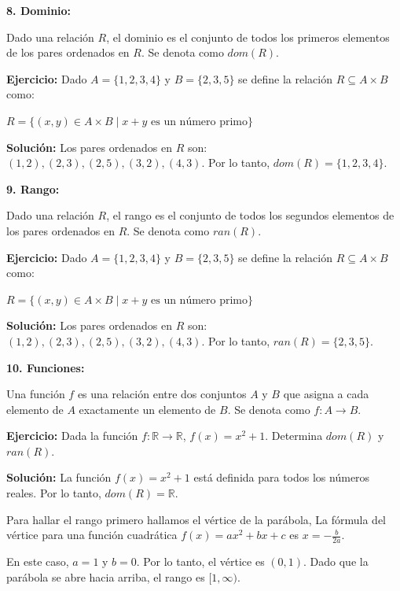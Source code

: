 \documentclass[11pt, a4paper]{article}
\begin{document}
\begin{multicols}{2}
    \begin{center}
      \textbf{8. Dominio:}
    \end{center}
    Dado una relación $R$, el dominio es el conjunto de todos los primeros elementos de los pares ordenados en $R$. Se denota como $dom(R)$.
    
    \textbf{Ejercicio:} Dado $A = \{1,2,3,4\}$ y $B = \{2,3,5\}$ se define la relación $R \subseteq A \times B$ como: 
    
    $R = \{(x, y) \in A \times B \mid x + y \text{ es un número primo} \}$

    
    \textbf{Solución:} Los pares ordenados en $R$ son: $(1, 2), (2, 3), (2, 5), (3, 2), (4, 3)$. Por lo tanto, $dom(R) = \{1, 2, 3, 4\}$.

    \begin{center}
      \textbf{9. Rango:}
    \end{center}
    Dado una relación $R$, el rango es el conjunto de todos los segundos elementos de los pares ordenados en $R$. Se denota como $ran(R)$.
    
    \textbf{Ejercicio:} Dado $A = \{1,2,3,4\}$ y $B = \{2,3,5\}$ se define la relación $R \subseteq A \times B$ como:
    
    $R = \{(x, y) \in A \times B \mid x + y \text{ es un número primo} \}$

    
    \textbf{Solución:} Los pares ordenados en $R$ son: $(1, 2), (2, 3), (2, 5), (3, 2), (4, 3)$. Por lo tanto, $ran(R) = \{2, 3, 5\}$.

    \begin{center}
      \textbf{10. Funciones:}
    \end{center}
    Una función $f$ es una relación entre dos conjuntos $A$ y $B$ que asigna a cada elemento de $A$ exactamente un elemento de $B$. Se denota como $f: A \rightarrow B$.
    
    \textbf{Ejercicio:} Dada la función $f: \mathbb{R} \rightarrow \mathbb{R}$, $f(x) = x^2 + 1$. Determina $dom(R)$ y $ran(R)$.
    
    \textbf{Solución:}  La función $f(x) = x^2 + 1$ está definida para todos los números reales. Por lo tanto, $dom(R) = \mathbb{R}$.

     Para hallar el rango primero hallamos el vértice de la parábola, La fórmula del vértice para una función cuadrática $f\left(x\right) = ax^2 + bx + c$ es $x = -\frac{b}{2a}$. 
    
    En este caso, $a = 1$ y $b = 0$. Por lo tanto, el vértice es $(0, 1)$. Dado que la parábola se abre hacia arriba, el rango es $[1, \infty)$.

  \end{multicols}
\end{document}
